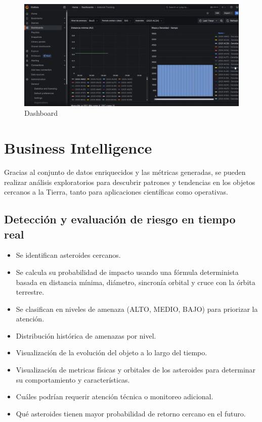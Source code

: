 \documentclass[12pt]{article}
\begin{document}
\begin{figure}[h!]
    \centering
    \includegraphics[width=.7\textwidth]{assets/proyecto/dashboard-2.PNG}
    \caption{Dashboard}
    \label{fig:my_label}
\end{figure}

\clearpage

\section{Business Intelligence}

Gracias al conjunto de datos enriquecidos y las métricas generadas, se pueden realizar análisis exploratorios para descubrir patrones y 
tendencias en los objetos cercanos a la Tierra, tanto para aplicaciones científicas como operativas.

\subsection{Detección y evaluación de riesgo en tiempo real}
\begin{itemize}
  \item Se identifican asteroides cercanos.
  \item Se calcula su probabilidad de impacto usando una fórmula determinista basada en distancia mínima, diámetro, 
  sincronía orbital y cruce con la órbita terrestre.
  \item Se clasifican en niveles de amenaza (ALTO, MEDIO, BAJO) para priorizar la atención.
  \item Distribución histórica de amenazas por nivel.
  \item Visualización de la evolución del objeto a lo largo del tiempo.
  \item Visualización de metricas físicas y orbitales de los asteroides para determinar su comportamiento y características.
  \item Cuáles podrían requerir atención técnica o monitoreo adicional.
  \item Qué asteroides tienen mayor probabilidad de retorno cercano en el futuro.
\end{itemize}
\end{document}
